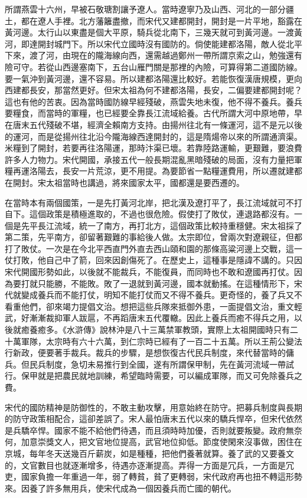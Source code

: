 所謂燕雲十六州，早被石敬瑭割讓予遼人。當時遼寧乃及山西、河北的一部分疆土，都在遼人手裡。北方藩籬盡撤，而宋代又建都開封，開封是一片平地，豁露在黃河邊。太行山以東盡是個大平原，騎兵從北南下，三幾天就可到黃河邊。一渡黃河，即達開封城門下。所以宋代立國時沒有國防的。倘使能建都洛陽，敵人從北平下來，渡了河，由現在的隴海線向西，還需越過鄭州一帶所謂京索之山，勉強還有險可守。若從山西邊塞南下，五台山雁門關是那裡的內險，可算得第二道國防線。要一氣沖到黃河邊，還不容易。所以建都洛陽還比較好。若能恢復漢唐規模，更向西建都長安，那當然更好。但宋太祖為何不建都洛陽，長安，二偏要建都開封呢？這也有他的苦衷。因為當時國防線早經殘破，燕雲失地未復，他不得不養兵。養兵要糧食，而當時的軍糧，也已經要全靠長江流域給養。古代所謂大河中原地帶，早在唐末五代殘破不堪，經濟全賴南方支持。由揚州往北有一條運河，這不是元以後的運河，而是從揚州往北沿今隴海線西達開封的，這是隋煬帝以來的所謂通濟渠。米糧到了開封，若要再往洛陽運，那時汴渠已壞。若靠陸路運輸，更艱難，要浪費許多人力物力。宋代開國，承接五代一般長期混亂黑暗殘破的局面，沒有力量把軍糧再運洛陽去，長安一片荒涼，更不用提。為要節省一點糧運費用，所以遷就建都在開封。宋太祖當時也講過，將來國家太平，國都還是要西遷的。

在當時本有兩個國策，一是先打黃河北岸，把北漢及遼打平了，長江流域就可不打自下。這個政策是積極進取的，不過也很危險。假使打了敗仗，連退路都沒有。一個是先平長江流域，統一了南方，再打北方，這個政策比較持重穩健。宋太祖採了第二策，先平南方，卻留著艱難的事給後人做。太宗即位，曾兩次對遼親征，但都打了敗仗。一次是在今北平西直門外直去西山頤和園的那條高粱河邊上交戰，這一仗打敗，他自己中了箭，回來因創傷死了。在歷史上，這種事是隱諱不講的。只因宋代開國形勢如此，以後就不能裁兵，不能復員，而同時也不敢和遼國再打仗。因為要打就只能勝，不能敗。敗了一退就到黃河邊，國本就動搖。在這種情形下，宋代就變成養兵而不能打仗，明知不能打仗而又不得不養兵。更奇怪的，養了兵又不看重他們，卻來竭力提倡文治。想把這些兵隊來抵御外患，一面提倡文治，重文輕武，好漸漸裁抑軍人跋扈，不再蹈唐末五代覆轍。因此上養兵而癒不得兵之用，以後就癒養癒多。《水滸傳》說林沖是八十三萬禁軍教頭，實際上太祖開國時只有二十萬軍隊，太宗時有六十六萬，到仁宗時已經有了一百二十五萬。所以王荊公變法行新政，便要著手裁兵。裁兵的步驟，是想恢復古代民兵制度，來代替當時的傭兵。但民兵制度，急切未易推行到全國，遂有所謂保甲制，先在黃河流域一帶試行。保甲就是把農民就地訓練，希望臨時需要，可以編成軍隊，而又可免除養兵之費。

宋代的國防精神是防御性的，不敢主動攻擊，用意始終在防守。把募兵制度與長期的防守政策相配合，這卻差誤了。宋人最怕唐末五代以來的驕兵悍卒，但宋代依然是兵驕卒悍。國家不能不給他們待遇，而且須時時加優，否則就要叛變。政府無奈何，加意崇獎文人，把文官地位提高，武官地位抑低。節度使閑來沒事做，困住在京城，每年冬天送幾百斤薪炭，如是種種，把他們養著就算。養了武的又要養文的，文官數目也就逐漸增多，待遇亦逐漸提高。弄得一方面是冗兵，一方面是冗吏，國家負擔一年重過一年，弱了轉貧，貧了更轉弱，宋代政府再也扭不轉這形勢來。因養了許多無用兵，使宋代成為一個因養兵而亡國的朝代。


